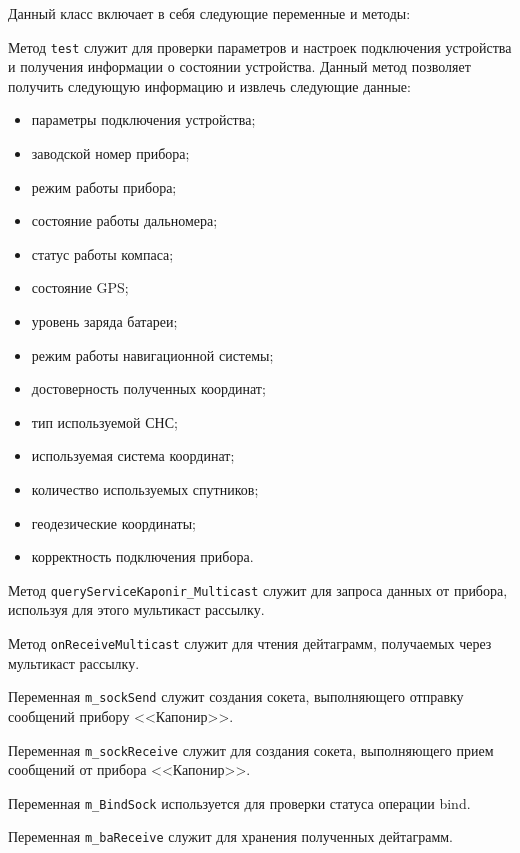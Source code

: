 Данный класс включает в себя следующие переменные и методы:
\begin{enum}
	\item Метод \texttt{test} служит для проверки параметров и настроек подключения устройства и получения
		информации о состоянии устройства. Данный метод позволяет получить следующую информацию и извлечь
		следующие данные:
		\begin{itemize}
			\item параметры подключения устройства;
			\item заводской номер прибора;
			\item режим работы прибора;
			\item состояние работы дальномера;
			\item статус работы компаса;
			\item состояние GPS;
			\item уровень заряда батареи;
			\item режим работы навигационной системы;
			\item достоверность полученных координат;
			\item тип используемой СНС;
			\item используемая система координат;
			\item количество используемых спутников;
			\item геодезические координаты;
			\item корректность подключения прибора.
		\end{itemize}

	\item Метод \texttt{queryServiceKaponir\_Multicast} служит для запроса данных от прибора, используя для этого
		мультикаст рассылку.

	\item Метод \texttt{onReceiveMulticast} служит для чтения дейтаграмм, получаемых через мультикаст рассылку.

	\item Переменная \texttt{m\_sockSend} служит создания сокета, выполняющего отправку сообщений прибору
		<<Капонир>>.

	\item Переменная \texttt{m\_sockReceive} служит для создания сокета, выполняющего прием сообщений от прибора
		<<Капонир>>.

	\item Переменная \texttt{m\_BindSock} используется для проверки статуса операции bind.

	\item Переменная \texttt{m\_baReceive} служит для хранения полученных дейтаграмм.
\end{enum}

